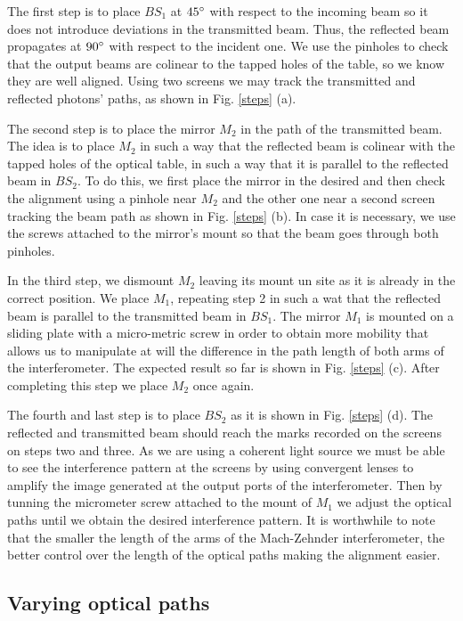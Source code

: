 \documentclass[12pt]{book}
\begin{document}
The first step is to place $BS_{1}$ at $45\degree$ with respect to the incoming beam so it does not introduce deviations in the transmitted beam. Thus, the reflected beam propagates at $90\degree$ with respect to the incident one. We use the pinholes to check that the output beams are colinear to the tapped holes of the table, so we know they are well aligned. Using two screens we may track the transmitted and reflected photons' paths, as shown in Fig. \ref{steps} (a).

The second step is to place the mirror $M_{2}$ in the path of the transmitted beam. The idea is to place $M_{2}$ in such a way that the reflected beam is colinear with the tapped holes of the optical table, in such a way that it is parallel to the reflected beam in $BS_{2}$. To do this, we first place the mirror in the desired and then check the alignment using a pinhole near $M_{2}$ and the other one near a second screen tracking the beam path as shown in Fig. \ref{steps} (b). In case it is necessary, we use the screws attached to the mirror's mount so that the beam goes through both pinholes.

In the third step, we dismount $M_{2}$ leaving its mount un site as it is already in the correct position. We place $M_{1}$, repeating step 2 in such a wat that the reflected beam is parallel to the transmitted beam in $BS_{1}$. The mirror $M_{1}$ is mounted on a sliding plate with a micro-metric screw in order to obtain more mobility that allows us to manipulate at will the difference in the path length of both arms of the interferometer. The expected result so far is shown in Fig. \ref{steps} (c). After completing this step we place $M_{2}$ once again.

The fourth and last step is to place $BS_{2}$ as it is shown in Fig. \ref{steps} (d). The reflected and transmitted beam should reach the marks recorded on the screens on steps two and three. As we are using a coherent light source we must be able to see the interference pattern at the screens by using convergent lenses to amplify the image generated at the output ports of the interferometer. Then by tunning the micrometer screw attached to the mount of $M_{1}$  we adjust the optical paths until we obtain the desired interference pattern. It is worthwhile to note that the smaller the length of the arms of the Mach-Zehnder interferometer, the better control over the length of the optical paths making the alignment easier.


\subsection{Varying optical paths}
\end{document}
